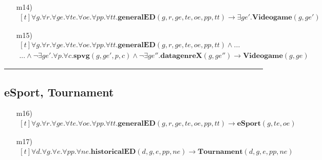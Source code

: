\begin{itemize}
	\item[m14)]
	$ \begin{aligned}[t]
	\forall g. \forall r. \forall ge. \forall te. \forall oe. \forall pp. \forall tt.\textbf{generalED}(g,r,ge,te,oe,pp,tt) \rightarrow \exists ge'. \textbf{Videogame}(g,ge')
	\end{aligned} $
	\item[m15)]
	$ \begin{aligned}[t]
	\forall g. \forall r. \forall ge. \forall te. \forall oe. \forall pp. \forall tt.\textbf{generalED}(g,r,ge,te,oe,pp,tt) \wedge ... \hspace{150pt}\\
	... \wedge \neg \exists ge'. \forall p. \forall c. \textbf{spvg}(g,ge',p,c) \wedge
	\neg \exists ge''.\textbf{datagenreX}(g,ge'')
	\rightarrow \textbf{Videogame}(g,ge)
	\end{aligned} $
\end{itemize}

\par\noindent\rule{\textwidth}{0.4pt}

\subsection*{eSport, Tournament}

\begin{itemize}
	\item[m16)]
	$ \begin{aligned}[t]
	\forall g. \forall r. \forall ge. \forall te. \forall oe. \forall pp. \forall tt.\textbf{generalED}(g,r,ge,te,oe,pp,tt) \rightarrow \textbf{eSport}(g,te,oe)
	\end{aligned} $
	\item[m17)]
	$ \begin{aligned}[t]
	\forall d. \forall g. \forall e. \forall pp. \forall ne.\textbf{historicalED}(d,g,e,pp,ne) \rightarrow \textbf{Tournament}(d,g,e,pp,ne)
	\end{aligned} $
\end{itemize}
